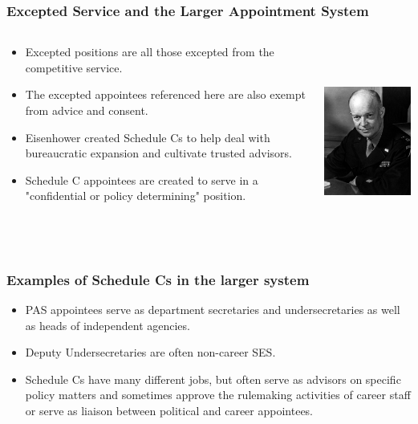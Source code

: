 \documentclass{beamer}
\begin{document}
\begin{frame}
\frametitle{Excepted Service and the Larger Appointment System}
\begin{columns}[T] %
\begin{column}{.48\textwidth}
\begin{itemize}\addtolength{\itemsep}{1\baselineskip}
\item Excepted positions are all those excepted from the competitive service.
\item The excepted appointees referenced here are also exempt from advice and consent.
\item Eisenhower created Schedule Cs to help deal with bureaucratic expansion and cultivate trusted advisors. 
\item Schedule C appointees are created to serve in a "confidential or policy determining" position.
\end{itemize}
\end{column}%
\hfill%
\begin{column}{.48\textwidth}
\includegraphics[height=2.5in,width=2in]{eisenhower.jpg}
\end{column}%
\end{columns}
\end{frame}

\begin{frame}
\frametitle{Examples of Schedule Cs in the larger system}
\begin{itemize}\addtolength{\itemsep}{1.5\baselineskip}
\item PAS appointees serve as department secretaries and undersecretaries as well as heads of independent agencies.
\item Deputy Undersecretaries are often non-career SES. 
\item Schedule Cs have many different jobs, but often serve as advisors on specific policy matters and sometimes approve the rulemaking activities of career staff or serve as liaison between political and career appointees.
\end{itemize}
\hfill%
\end{frame}
\end{document}
